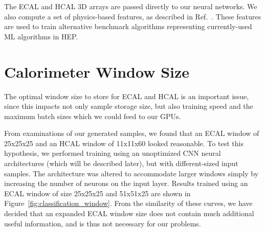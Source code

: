 The ECAL and HCAL 3D arrays are passed directly to our neural networks. We also compute a set of physics-based features, as described in Ref.~\cite{NIPS}. These features are used to train alternative benchmark algorithms representing currently-used ML algorithms in HEP.

\section{Calorimeter Window Size}\label{calo_rec_window_size}

The optimal window size to store for ECAL and HCAL is an important issue, since this impacts not only sample storage size, but also training speed and the maximum batch sizes which we could feed to our GPUs. 

From examinations of our generated samples, we found that an ECAL window of 25x25x25 and an HCAL window of 11x11x60 looked reasonable. To test this hypothesis, we performed training using an unoptimized CNN neural architectures (which will be described later), but with different-sized input samples. The architecture was altered to accommodate larger windows simply by increasing the number of neurons on the input layer. Results trained using an ECAL window of size 25x25x25 and 51x51x25 are shown in Figure~\ref{fig:classification_window}. From the similarity of these curves, we have decided that an expanded ECAL window size does not contain much additional useful information, and is thus not necessary for our problems.

